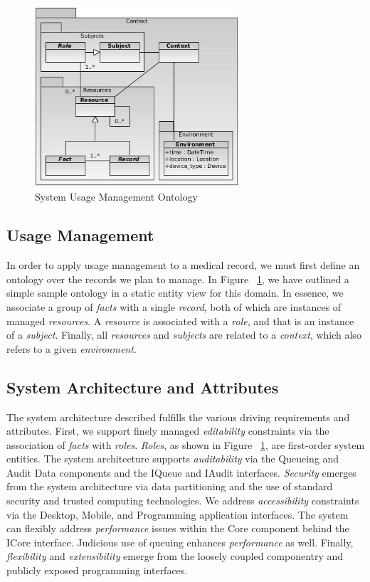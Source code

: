 \documentclass[10pt, conference, compsocconf]{IEEEtran}
\begin{document}
\begin{figure}[!t]
\centering
\includegraphics[width=3in]{UMOntology}
\caption{System Usage Management Ontology}
\label{fig:Ontology}
\end{figure}

\subsection{Usage Management}
In order to apply usage management to a medical record, we must first define an ontology over the records we plan to manage.  In Figure ~\ref{fig:Ontology}, we have outlined a simple sample ontology in a static entity view for this domain.  In essence, we associate a group of \textit{facts} with a single \textit{record}, both of which are instances of managed \textit{resources}.  A \textit{resource} is associated with a \textit{role}, and that is an instance of a \textit{subject}.  Finally, all \textit{resources} and \textit{subjects} are related to a \textit{context}, which also refers to a given \textit{environment}.

\subsection{System Architecture and Attributes}
The system architecture described fulfills the various driving requirements and attributes.  First, we support finely managed \textit{editability} constraints via the association of \textit{facts} with \textit{roles}.  \textit{Roles}, as shown in Figure ~\ref{fig:Ontology}, are first-order system entities.  The system architecture supports \textit{auditability} via the Queueing and Audit Data components and the IQueue and IAudit interfaces.  \textit{Security} emerges from the system architecture via data partitioning and the use of standard security and trusted computing technologies.  We address \textit{accessibility} constraints via the Desktop, Mobile, and Programming application interfaces.  The system can flexibly address \textit{performance} issues within the Core component behind the ICore interface.  Judicious use of queuing enhances \textit{performance} as well.  Finally, \textit{flexibility} and \textit{extensibility} emerge from the loosely coupled componentry and publicly exposed programming interfaces.
\end{document}
